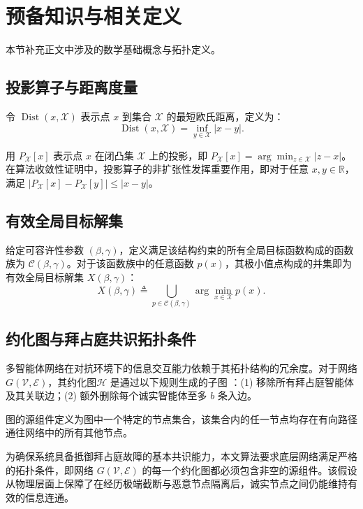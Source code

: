 \chapter{预备知识与相关定义}

\setcounter{figure}{0}
\renewcommand{\thefigure}{A\arabic{figure}}
\setcounter{table}{0}
  
\renewcommand{\thetable}{A\arabic{table}}
\setcounter{equation}{0}
\renewcommand{\theequation}{A\arabic{equation}}

本节补充正文中涉及的数学基础概念与拓扑定义。

\section{投影算子与距离度量}

令 $\operatorname{Dist}(x,\mathcal{X})$ 表示点 $x$ 到集合 $\mathcal{X}$ 的最短欧氏距离，定义为：
\begin{equation}
    \operatorname{Dist}(x,\mathcal{X}) = \inf_{y\in\mathcal{X}}|x-y|.
    \label{eq:dist_app}
\end{equation}

用 $P_{\mathcal{X}}[x]$ 表示点 $x$ 在闭凸集 $\mathcal{X}$ 上的投影，即 $P_{\mathcal{X}}[x] = \arg\min_{z\in\mathcal{X}}|z-x|$。在算法收敛性证明中，投影算子的非扩张性发挥重要作用，即对于任意 $x,y\in\mathbb{R}$，满足 $|P_{\mathcal{X}}[x] - P_{\mathcal{X}}[y]| \le |x-y|$。

\section{有效全局目标解集}

给定可容许性参数 $(\beta,\gamma)$，定义满足该结构约束的所有全局目标函数构成的函数族为 $\mathcal{C}(\beta,\gamma)$。对于该函数族中的任意函数 $p(x)$，其极小值点构成的并集即为有效全局目标解集 $X(\beta,\gamma)$：
\begin{equation}
    X(\beta,\gamma)\triangleq \bigcup_{p\in\mathcal{C}(\beta,\gamma)} \arg\min_{x\in\mathcal{X}} p(x).
    \label{eq:Xdef_app}
\end{equation}

\section{约化图与拜占庭共识拓扑条件}

多智能体网络在对抗环境下的信息交互能力依赖于其拓扑结构的冗余度。对于网络 $G(\mathcal{V},\mathcal{E})$，其约化图$\mathcal{H}$ 是通过以下规则生成的子图 ：(1) 移除所有拜占庭智能体及其关联边；(2) 额外删除每个诚实智能体至多 $b$ 条入边。

图的源组件定义为图中一个特定的节点集合，该集合内的任一节点均存在有向路径通往网络中的所有其他节点。

为确保系统具备抵御拜占庭故障的基本共识能力，本文算法要求底层网络满足严格的拓扑条件，即网络 $G(\mathcal{V},\mathcal{E})$ 的每一个约化图都必须包含非空的源组件。该假设从物理层面上保障了在经历极端截断与恶意节点隔离后，诚实节点之间仍能维持有效的信息连通。
